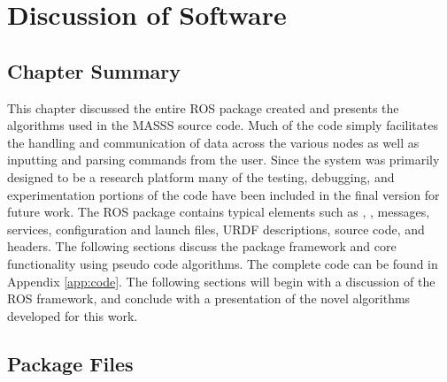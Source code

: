 \chapter{Discussion of Software}
\label{chap:code}
\section{Chapter Summary}
This chapter discussed the entire ROS package created and presents the algorithms used in the MASSS source code. Much of the code simply facilitates the handling and communication of data across the various nodes as well as inputting and parsing commands from the user. Since the system was primarily designed to be a research platform many of the testing, debugging, and experimentation portions of the code have been included in the final version for future work. The ROS package contains typical elements such as , , messages, services, configuration and launch files, URDF descriptions, source code, and headers. The following sections discuss the package framework and core functionality using pseudo code algorithms. The complete code can be found in Appendix \ref{app:code}. The following sections will begin with a discussion of the ROS framework, and conclude with a presentation of the novel algorithms developed for this work.\\
\section{Package Files}

